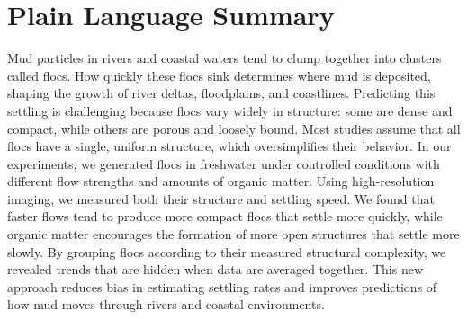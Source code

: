 \documentclass{agujournal2019}
\begin{document}
\section*{Plain Language Summary}
Mud particles in rivers and coastal waters tend to clump together into clusters called flocs. How quickly these flocs sink determines where mud is deposited, shaping the growth of river deltas, floodplains, and coastlines. Predicting this settling is challenging because flocs vary widely in structure: some are dense and compact, while others are porous and loosely bound. Most studies assume that all flocs have a single, uniform structure, which oversimplifies their behavior. In our experiments, we generated flocs in freshwater under controlled conditions with different flow strengths and amounts of organic matter. Using high-resolution imaging, we measured both their structure and settling speed. We found that faster flows tend to produce more compact flocs that settle more quickly, while organic matter encourages the formation of more open structures that settle more slowly. By grouping flocs according to their measured structural complexity, we revealed trends that are hidden when data are averaged together. This new approach reduces bias in estimating settling rates and improves predictions of how mud moves through rivers and coastal environments.

%
%

%


%
%
%
%
\end{document}
